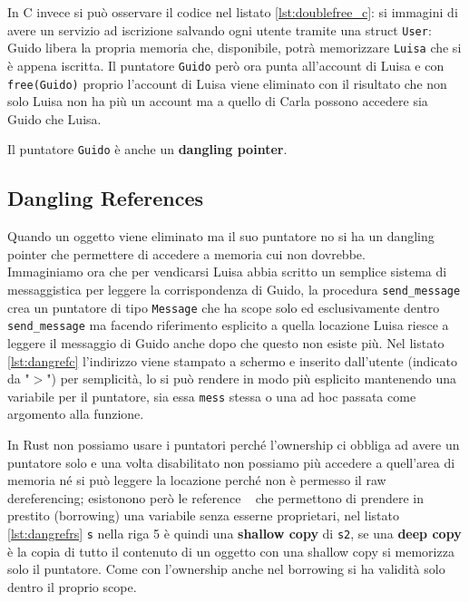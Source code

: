 \documentclass{report}
\begin{document}



In C invece si può osservare il codice nel listato \ref{lst:doublefree_c}: si immagini di avere un servizio ad iscrizione salvando ogni utente tramite una struct \texttt{User}: Guido libera la propria memoria che, disponibile, potrà memorizzare \texttt{Luisa} che si è appena iscritta. Il puntatore \texttt{Guido} però ora punta all'account di Luisa e con \texttt{free(Guido)} proprio l'account di Luisa viene eliminato con il risultato che non solo Luisa non ha più un account ma a quello di Carla possono accedere sia Guido che Luisa.




Il puntatore \texttt{Guido} è anche un \textbf{dangling pointer}.

\subsection{Dangling References} \label{sec:dangling_reference}
Quando un oggetto viene eliminato ma il suo puntatore no si ha un dangling pointer che permettere di accedere a memoria cui non dovrebbe. \\
Immaginiamo ora che per vendicarsi Luisa abbia scritto un semplice sistema di messaggistica per leggere la corrispondenza di Guido, la procedura \texttt{send\_message} crea un puntatore di tipo \texttt{Message} che ha scope solo ed esclusivamente dentro \texttt{send\_message} ma facendo riferimento esplicito a quella locazione Luisa riesce a leggere il messaggio di Guido anche dopo che questo non esiste più. Nel listato \ref{lst:dangrefc} l'indirizzo viene stampato a schermo e inserito dall'utente (indicato da "$>$") per semplicità, lo si può rendere in modo più esplicito mantenendo una variabile per il puntatore, sia essa \texttt{mess} stessa o una ad hoc passata come argomento alla funzione.




In Rust non possiamo usare i puntatori perché l'ownership ci obbliga ad avere un puntatore solo e una volta disabilitato non possiamo più accedere a quell'area di memoria né si può leggere la locazione perché non è permesso il raw dereferencing; esistonono però le reference ~\cite[4.2]{rust:language} che permettono di prendere in prestito (borrowing) una variabile senza esserne proprietari, nel listato \ref{lst:dangrefrs} \texttt{s} nella riga 5 è quindi una \textbf{shallow copy} di \texttt{s2}, se una \textbf{deep copy} è la copia di tutto il contenuto di un oggetto con una shallow copy si memorizza solo il puntatore. Come con l'ownership anche nel borrowing si ha validità solo dentro il proprio scope.
\end{document}
